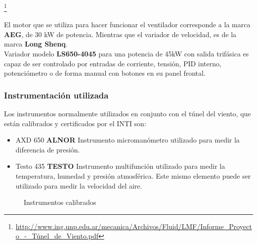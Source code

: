 			\footnote{\url{http://www.ing.unp.edu.ar/mecanica/Archivos/Fluid/LMF/Informe_Proyecto_-_Túnel_de_Viento.pdf}}
	\begin{minipage}[t]{.5\textwidth}
		
El motor que se utiliza para hacer funcionar el ventilador corresponde a la marca \textbf{AEG}, de 30 kW de potencia. Mientras que el variador de velocidad, es de la marca \textbf{Long Shenq}. \\
Variador modelo \textbf{LS650-4045} para una potencia de 45kW con salida trifásica es capaz de ser controlado por entradas de corriente, tensión, PID interno, potenciómetro o de forma manual con botones en su panel frontal.
	\end{minipage}	
	\begin{minipage}[t]{.5\textwidth}
		\centering{}
		\label{fig:LS650}
	\end{minipage}

		
	\subsubsection{Instrumentación utilizada}
	Los instrumentos normalmente utilizados en conjunto con el túnel del viento, que están calibrados y certificados por el INTI son:
\begin{itemize}
	\item AXD 650 \textbf{ALNOR} 
		\subitem Instrumento micromanómetro utilizado para medir la diferencia de presión.
	\item Testo 435 \textbf{TESTO}
	\subitem Instrumento multifunción utilizado para medir la temperatura, humedad y presión atmosférica. Este mismo elemento puede ser utilizado para medir la velocidad del aire.
	
\end{itemize}	   		
		
\begin{figure}[htbp]
	\centering
	\caption{Instrumentos calibrados} \label{fig:instr}
\end{figure}		
		
		
		\newpage